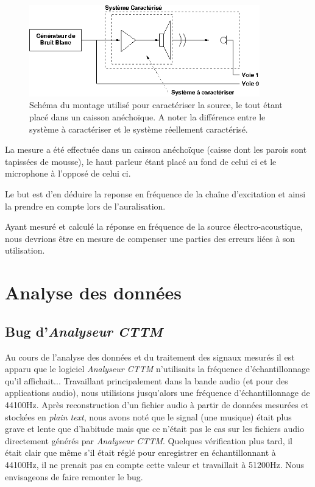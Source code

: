 \documentclass[12pt]{article}
\begin{document}
\begin{figure}[h!]
\begin{center}
\includegraphics[width=10cm]{carac_source}
\end{center}
\caption{\label{carac_source}Schéma du montage utilisé pour caractériser la source, le tout étant placé dans un caisson anéchoïque. A noter la différence entre le système à caractériser et le système réellement caractérisé.}
\end{figure}

La mesure a été effectuée dans un caisson anéchoïque (caisse dont les parois sont tapissées de mousse), le haut parleur étant placé au fond de celui ci et le microphone à l'opposé de celui ci.

Le but est d'en déduire la reponse en fréquence de la chaîne d'excitation et ainsi la prendre en compte lors de l'auralisation.

Ayant mesuré et calculé la réponse en fréquence de la source électro-acoustique, nous devrions être en mesure de compenser une parties des erreurs liées à son utilisation.


\section{Analyse des données} %

\subsection{Bug d'\emph{Analyseur CTTM}}%

Au cours de l'analyse des données et du traitement des signaux mesurés il est apparu que le logiciel \emph{Analyseur CTTM} n'utilisaits la fréquence d'échantillonnage qu'il affichait... Travaillant principalement dans la bande audio (et pour des applications audio), nous utilisions jusqu'alors une fréquence d'échantillonnage de 44100Hz. Après reconstruction d'un fichier audio à partir de données mesurées et stockées en \textit{plain text}, nous avons noté que le signal (une musique) était plus grave et lente que d'habitude mais que ce n'était pas le cas sur les fichiers audio directement générés par \emph{Analyseur CTTM}. Quelques vérification plus tard, il était clair que même s'il était réglé pour enregistrer en échantillonnant à 44100Hz, il ne prenait pas en compte cette valeur et travaillait à 51200Hz. Nous envisageons de faire remonter le bug.
\end{document}
